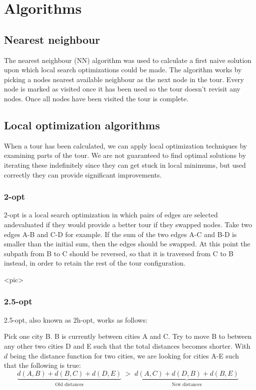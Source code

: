 \documentclass[paper=a4, fontsize=11pt,numbers=endperiod]{scrartcl} %
\numberwithin{equation}{section} %
\numberwithin{figure}{section} %
\numberwithin{table}{section} %
\begin{document}
\section{Algorithms}

\subsection{Nearest neighbour}
The nearest neighbour (NN) algorithm was used to calculate a first naive solution upon which local search optimizations could be made.
The algorithm works by picking a nodes nearest available neighbour as the next node in the tour.
Every node is marked as visited once it has been used so the tour doesn't revisit any nodes.
Once all nodes have been visited the tour is complete.

\subsection{Local optimization algorithms}
When a tour has been calculated, we can apply local optimization techniques by examining parts of the tour. We are not guaranteed to find optimal solutions by iterating these indefinitely since they can get stuck in local minimums, but used correctly they can provide significant improvements.

\subsubsection{2-opt}
2-opt is a local search optimization in which pairs of edges are selected andevaluated if they would provide a better tour if they swapped nodes.
Take two edges A-B and C-D for example.
If the sum of the two edges A-C and B-D is smaller than the initial sum, then the edges should be swapped.
At this point the subpath from B to C should be reversed, so that it is traversed from C to B instead, in order to retain the rest of the tour configuration.

<pic>

\subsubsection{2.5-opt}
2.5-opt, also known as 2h-opt, works as follows:

Pick one city B. B is currently between cities A and C. Try to move B to between any other two cities D and E such that the total distances becomes shorter. With $d$ being the distance function for two cities, we are looking for cities A-E such that the following is true:
\[
    \underbrace{d(A,B) + d(B,C) + d(D,E)}_\text{Old distances}\; > \;\underbrace{d(A,C) + d(D,B) + d(B,E)}_\text{New distances}
\]
\end{document}
